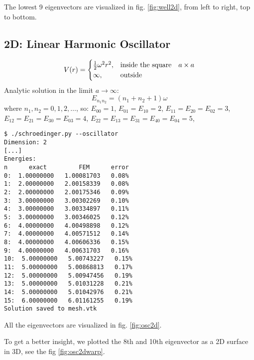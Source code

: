 The lowest 9 eigenvectors are visualized in fig. \ref{fig:well2d}, from left to
right, top to bottom.




\subsection{2D: Linear Harmonic Oscillator}

$$V(r)=\begin{cases}{\textstyle{1\over2}}\omega^2r^2,&\text{inside the square}\quad a\times a \\
\infty, & \text{outside}\end{cases}$$
Analytic solution in the limit $a\to\infty$:
$$E_{n_1n_2}=\left(n_1+n_2+1\right)\omega$$
where $n_1, n_2 = 0, 1, 2, \dots$, so:
$E_{00} = 1$,
$E_{01} = E_{10} = 2$,
$E_{11} = E_{20} = E_{02} = 3$,
$E_{12} = E_{21} = E_{30} = E_{03} = 4$,
$E_{22} = E_{13} = E_{31} = E_{40} = E_{04} = 5$,

\begin{lstlisting}
$ ./schroedinger.py --oscillator
Dimension: 2
[...]
Energies:
n      exact         FEM      error
0:  1.00000000   1.00081703   0.08%
1:  2.00000000   2.00158339   0.08%
2:  2.00000000   2.00175346   0.09%
3:  3.00000000   3.00302269   0.10%
4:  3.00000000   3.00334897   0.11%
5:  3.00000000   3.00346025   0.12%
6:  4.00000000   4.00498898   0.12%
7:  4.00000000   4.00571512   0.14%
8:  4.00000000   4.00606336   0.15%
9:  4.00000000   4.00631703   0.16%
10:  5.00000000   5.00743227   0.15%
11:  5.00000000   5.00868813   0.17%
12:  5.00000000   5.00947456   0.19%
13:  5.00000000   5.01031228   0.21%
14:  5.00000000   5.01042976   0.21%
15:  6.00000000   6.01161255   0.19%
Solution saved to mesh.vtk
\end{lstlisting}

All the eigenvectors are visualized in fig. \ref{fig:osc2d}.


To get a better insight, we plotted the 8th and 10th eigenvector as a 2D surface
in 3D, see the fig \ref{fig:osc2dwarp}.


